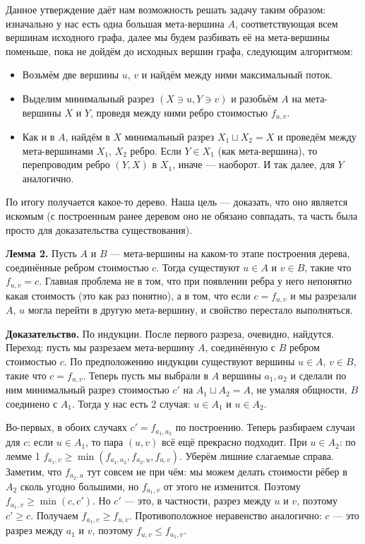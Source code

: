 Данное утверждение даёт нам возможность решать задачу таким образом: изначально у нас есть одна большая мета-вершина $A$, соответствующая всем вершинам исходного графа, далее мы будем разбивать её на мета-вершины поменьше, пока не дойдём до исходных вершин графа, следующим алгоритмом:
\begin{itemize}
    \item Возьмём две вершины $u$, $v$ и найдём между ними максимальный поток.
    \item Выделим минимальный разрез $(X \ni u, Y \ni v)$ и разобьём $A$ на мета-вершины $X$ и $Y$, проведя между ними ребро стоимостью $f_{u,v}$.
    \item Как и в $A$, найдём в $X$ минимальный разрез $X_1 \sqcup X_2 = X$ и проведём между мета-вершинами $X_1$, $X_2$ ребро.
        Если $Y \in X_1$ (как мета-вершина), то перепроводим ребро $(Y, X)$ в $X_1$, иначе --- наоборот.
        И так далее, для $Y$ аналогично.
\end{itemize}

По итогу получается какое-то дерево. Наша цель --- доказать, что оно является искомым (с построенным ранее деревом оно не обязано совпадать, та часть была просто для доказательства существования).

\textbf{Лемма 2.} Пусть $A$ и $B$ --- мета-вершины на каком-то этапе построения дерева, соединённые ребром стоимостью $c$.
Тогда существуют $u \in A$ и $v \in B$, такие что $f_{u,v} = c$.
Главная проблема не в том, что при появлении ребра у него непонятно какая стоимость (это как раз понятно), а в том, что если $c = f_{u, v}$ и мы разрезали $A$, $u$ могла перейти в другую мета-вершину, и свойство перестало выполняться.

\textbf{Доказательство.} По индукции. После первого разреза, очевидно, найдутся.
Переход: пусть мы разрезаем мета-вершину $A$, соединённую с $B$ ребром стоимостью $c$.
По предположению индукции существуют вершины $u \in A$, $v \in B$, такие что $c = f_{u,v}$.
Теперь пусть мы выбрали в $A$ вершины $a_1, a_2$ и сделали по ним минимальный разрез стоимостью $c'$ на $A_1 \sqcup A_2 = A$, не умаляя общности, $B$ соединено с $A_1$.
Тогда у нас есть 2 случая: $u \in A_1$ и $u \in A_2$.

\begin{figure}[ht]
    \centering
\end{figure}

Во-первых, в обоих случаях $c' = f_{a_1, a_2}$ по построению.
Теперь разбираем случаи для $c$: если $u \in A_1$, то пара $(u, v)$ всё ещё прекрасно подходит.
При $u \in A_2$: по лемме 1 $f_{a_1, v} \ge \min(f_{a_1, a_2}, f_{a_2,u}, f_{u,v})$.
Уберём лишние слагаемые справа.
Заметим, что $f_{a_2, u}$ тут совсем не при чём: мы можем делать стоимости рёбер в $A_2$ сколь угодно большими, но $f_{a_1, v}$ от этого не изменится.
Поэтому $f_{a_1, v} \ge \min(c, c')$.
Но $c'$ --- это, в частности, разрез между $u$ и $v$, поэтому $c' \ge c$.
Получаем $f_{a_1, v} \ge f_{u,v}$.
Противоположное неравенство аналогично: $c$ --- это разрез между $a_1$ и $v$, поэтому $f_{u,v} \le f_{a_1, v}$.

